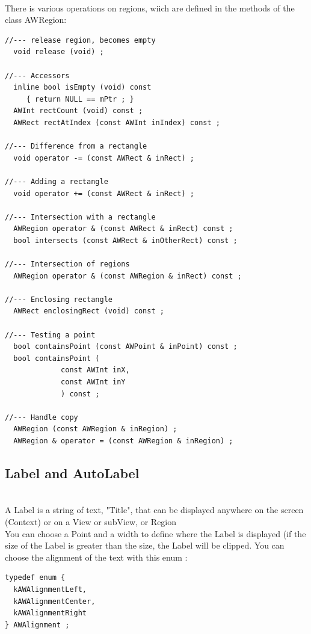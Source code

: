 \documentclass[a4paper,11pt]{extarticle}
\begin{document}
~\\ There is various operations on regions, wiich are defined in the methods of the class AWRegion:
\begin{lstlisting}[language=Arduinonl]
//--- release region, becomes empty
  void release (void) ;

//--- Accessors
  inline bool isEmpty (void) const 
     { return NULL == mPtr ; }
  AWInt rectCount (void) const ;
  AWRect rectAtIndex (const AWInt inIndex) const ;

//--- Difference from a rectangle
  void operator -= (const AWRect & inRect) ;

//--- Adding a rectangle
  void operator += (const AWRect & inRect) ;

//--- Intersection with a rectangle
  AWRegion operator & (const AWRect & inRect) const ;
  bool intersects (const AWRect & inOtherRect) const ;

//--- Intersection of regions
  AWRegion operator & (const AWRegion & inRect) const ;

//--- Enclosing rectangle
  AWRect enclosingRect (void) const ;

//--- Testing a point
  bool containsPoint (const AWPoint & inPoint) const ;
  bool containsPoint (
             const AWInt inX, 
             const AWInt inY
             ) const ;

//--- Handle copy
  AWRegion (const AWRegion & inRegion) ;
  AWRegion & operator = (const AWRegion & inRegion) ;
\end{lstlisting}


\newpage
\subsection{Label and AutoLabel}

~\\ A Label is a string of text, "Title", that can be displayed anywhere on the screen (Context) or on a View or subView, or Region
~\\ You can choose a Point and a width to define where the Label is displayed (if the size of the Label is greater than the size, the Label will be clipped. You can choose the alignment of the text with this enum :

\begin{lstlisting}[language=Arduinonl]
typedef enum {
  kAWAlignmentLeft,
  kAWAlignmentCenter,
  kAWAlignmentRight
} AWAlignment ;
\end{lstlisting}
\end{document}
